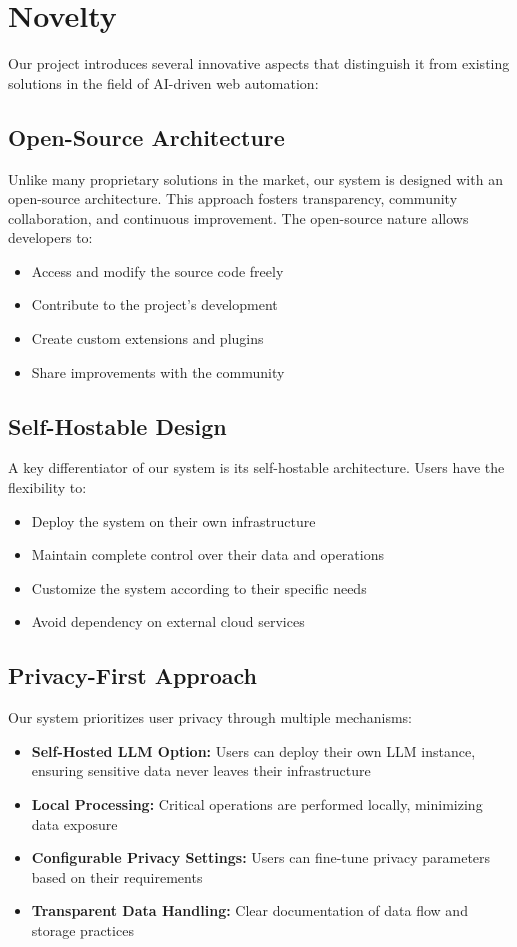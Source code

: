 \documentclass[conference]{IEEEtran}
\begin{document}
\section{Novelty}
Our project introduces several innovative aspects that distinguish it from existing solutions in the field of AI-driven web automation:

\subsection{Open-Source Architecture}
Unlike many proprietary solutions in the market, our system is designed with an open-source architecture. This approach fosters transparency, community collaboration, and continuous improvement. The open-source nature allows developers to:
\begin{itemize}
    \item Access and modify the source code freely
    \item Contribute to the project's development
    \item Create custom extensions and plugins
    \item Share improvements with the community
\end{itemize}

\subsection{Self-Hostable Design}
A key differentiator of our system is its self-hostable architecture. Users have the flexibility to:
\begin{itemize}
    \item Deploy the system on their own infrastructure
    \item Maintain complete control over their data and operations
    \item Customize the system according to their specific needs
    \item Avoid dependency on external cloud services
\end{itemize}

\subsection{Privacy-First Approach}
Our system prioritizes user privacy through multiple mechanisms:
\begin{itemize}
    \item \textbf{Self-Hosted LLM Option:} Users can deploy their own LLM instance, ensuring sensitive data never leaves their infrastructure
    \item \textbf{Local Processing:} Critical operations are performed locally, minimizing data exposure
    \item \textbf{Configurable Privacy Settings:} Users can fine-tune privacy parameters based on their requirements
    \item \textbf{Transparent Data Handling:} Clear documentation of data flow and storage practices
\end{itemize}
\end{document}
